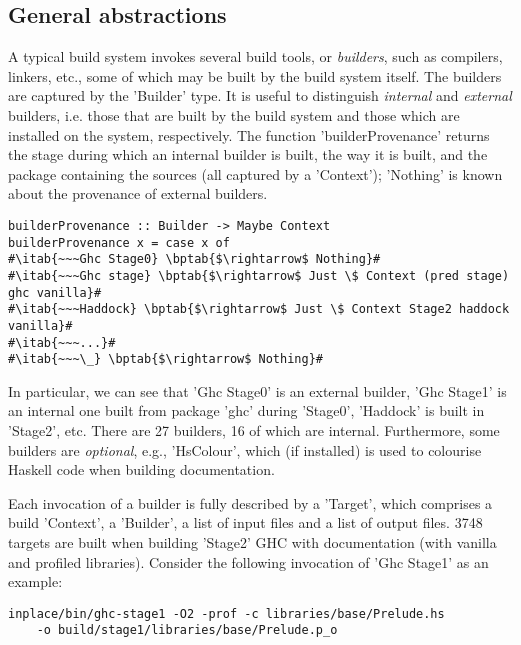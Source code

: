 \subsection{General abstractions}

A typical build system invokes several build tools, or \emph{builders}, such as
compilers, linkers, etc., some of which may be built by the
build system itself. The builders are captured by the \lst'Builder' type. It
is useful to distinguish \emph{internal} and \emph{external} builders, i.e.
those that are built by the build system and those which are installed on the
system, respectively. The function \lst'builderProvenance' returns the stage
during which an internal builder is built, the way it is built, and the package
containing the sources (all captured by a \lst'Context'); \lst'Nothing' is
known about the provenance of external builders.

\newcommand{\bptab}[1]{\hspace{.143\textwidth}\rlap{#1}}

\begin{lstlisting}
builderProvenance :: Builder -> Maybe Context
builderProvenance x = case x of
#\itab{~~~Ghc Stage0} \bptab{$\rightarrow$ Nothing}#
#\itab{~~~Ghc stage} \bptab{$\rightarrow$ Just \$ Context (pred stage) ghc vanilla}#
#\itab{~~~Haddock} \bptab{$\rightarrow$ Just \$ Context Stage2 haddock vanilla}#
#\itab{~~~...}#
#\itab{~~~\_} \bptab{$\rightarrow$ Nothing}#
\end{lstlisting}

\noindent In particular, we can see that \lst'Ghc Stage0' is an external
builder, \lst'Ghc Stage1' is an internal one built from package \lst'ghc'
during \lst'Stage0', \lst'Haddock' is built in \lst'Stage2', etc. There are
27 builders, 16 of which are internal. Furthermore, some builders are
\emph{optional}, e.g., \lst'HsColour', which (if installed) is used to
colourise Haskell code when building documentation.

Each invocation of a builder is fully described by a \lst'Target', which
comprises a build \lst'Context', a \lst'Builder', a list of input files and
a list of output files. 3748 targets are built when building \lst'Stage2' GHC
with documentation (with vanilla and profiled libraries). Consider the following
invocation of \lst'Ghc Stage1' as an example:

\begin{lstlisting}
inplace/bin/ghc-stage1 -O2 -prof -c libraries/base/Prelude.hs
    -o build/stage1/libraries/base/Prelude.p_o
\end{lstlisting}

